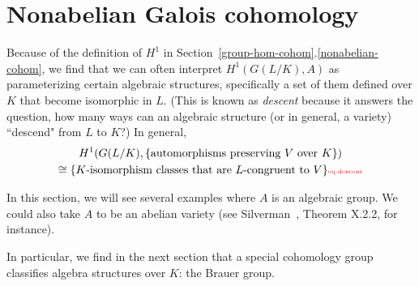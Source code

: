 \section{Nonabelian Galois cohomology}
Because of the definition of $H^1$ in Section~\ref{group-hom-cohom}.\ref{nonabelian-cohom}, we find that we can often interpret $H^1(G(L/K),A)$ as parameterizing certain algebraic structures, specifically a set of them defined over $K$ that become isomorphic in $L$. (This is known as {\it descent} because it answers the question, how many ways can an algebraic structure (or in general, a variety) ``descend" from $L$ to $K$?)
In general,
\begin{multline}
H^1(G(L/K),\{\text{automorphisms preserving $V$ over $K$}\})\\
\cong \{\text{$K$-isomorphism classes that are $L$-congruent to $V$}\}
\llabel{eq:descent}
\end{multline}


In this section, we will see several examples where $A$ is an algebraic group. We could also take $A$ to be an abelian variety (see Silverman~\cite{Si86}, Theorem X.2.2, for instance).

In particular, we find in the next section that a special cohomology group classifies algebra structures over $K$: the Brauer group.

